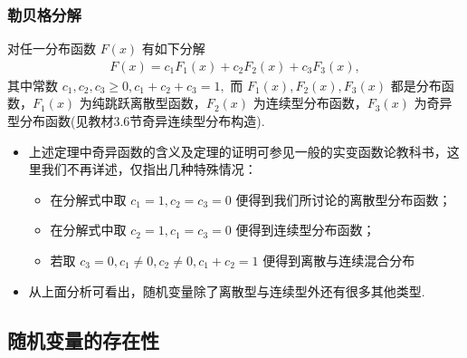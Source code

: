 \documentclass[Prob-All.tex]{subfiles}
\begin{document}
\begin{frame}
	\frametitle{勒贝格分解}
	\begin{thm}[勒贝格分解] 对任一分布函数 $F (x)$ 有如下分解
		\begin{eqnarray*}
			F(x)=c_1F_1(x)+c_2F_2(x)+c_3F_3(x),
		\end{eqnarray*}
		其中常数 $c_1,c_2,c_3\ge 0, c_1+c_2+c_3=1,$ 而 $F_1 (x),F_2 (x),F_3 (x)$ 都是分布函数，$F_1 (x)$ 为纯跳跃离散型函数，$F_2 (x)$ 为连续型分布函数，$F_3 (x)$ 为奇异型分布函数(见教材3.6节奇异连续型分布构造).
	\end{thm}
	\vspace{0.3cm}
	\pause
	\begin{itemize}[<+-|alert@+>]
		\item 上述定理中奇异函数的含义及定理的证明可参见一般的实变函数论教科书，这里我们不再详述，仅指出几种特殊情况：
		      \begin{itemize}
			      \item 在分解式中取 $c_1=1,c_2=c_3=0$ 便得到我们所讨论的离散型分布函数；
			      \item 在分解式中取 $c_2=1,c_1=c_3=0$ 便得到连续型分布函数；
			      \item 若取 $c_3=0, c_1\neq 0, c_2\neq 0, c_1+c_2=1$ 便得到离散与连续混合分布
		      \end{itemize}
		\item 从上面分析可看出，随机变量除了离散型与连续型外还有很多其他类型.
	\end{itemize}

\end{frame}


\subsection{随机变量的存在性}
\end{document}
